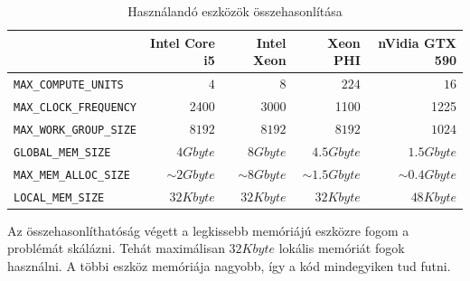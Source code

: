 	\begin{table}[!h]
	\setlength{\extrarowheight}{8pt}
	\caption{Használandó eszközök összehasonlítása}
	\label{table:envs}
	\centering
	\footnotesize
	\begin{tabular}{ l | r | r | r | r}
		 & Intel Core i5 & Intel Xeon & Xeon PHI & nVidia GTX 590\\ \hline
		\texttt{MAX\_COMPUTE\_UNITS} & $4$ & $8$ & $224$ & $16$\\
		\texttt{MAX\_CLOCK\_FREQUENCY} & 2400 & 3000 & 1100 & 1225\\
		\texttt{MAX\_WORK\_GROUP\_SIZE} & $8192$ & $8192$ & $8192$ & $1024$\\ \hline\hline
		\texttt{GLOBAL\_MEM\_SIZE} & $4Gbyte$ & $8Gbyte$ & $4.5Gbyte$ & $1.5Gbyte$\\
		\texttt{MAX\_MEM\_ALLOC\_SIZE} & $\sim 2Gbyte$ & $\sim 8Gbyte$ & $\sim 1.5Gbyte$ & $\sim 0.4Gbyte$\\
		\texttt{LOCAL\_MEM\_SIZE} & $32 Kbyte$ & $32 Kbyte$ & $32 Kbyte$ & $48 Kbyte$\\
	\end{tabular}
	
	\end{table}
	
	Az összehasonlíthatóság végett a legkissebb memóriájú eszközre fogom a problémát skálázni. Tehát maximálisan $32 Kbyte$ lokális
	memóriát fogok használni. A többi eszköz memóriája nagyobb, így a kód mindegyiken tud futni.
	
